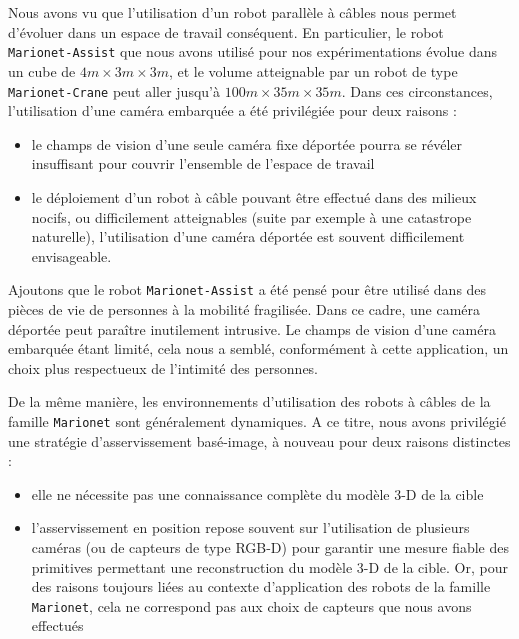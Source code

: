 Nous avons vu que l'utilisation d'un robot parallèle à câbles nous permet 
d'évoluer dans un espace de travail conséquent. En particulier, le robot {\tt 
Marionet-Assist} que nous avons utilisé pour nos expérimentations évolue dans 
un cube de $4m \times 3m \times 3m$, et le volume atteignable par un robot de type 
{\tt Marionet-Crane} peut aller jusqu'à $100m \times 35m \times 35m$. Dans ces 
circonstances, l'utilisation d'une caméra embarquée a été privilégiée pour deux 
raisons :
\begin{itemize}
 \item le champs de vision d'une seule caméra fixe déportée pourra se révéler 
insuffisant pour couvrir l'ensemble de l'espace de travail
 \item le déploiement d'un robot à câble pouvant être effectué dans des milieux 
nocifs, ou difficilement atteignables (suite par exemple à une catastrope 
naturelle), l'utilisation d'une caméra déportée est souvent difficilement 
envisageable.
\end{itemize}

Ajoutons que le robot {\tt Marionet-Assist} a été pensé pour être utilisé dans 
des pièces de vie de personnes à la mobilité fragilisée. Dans ce cadre, une 
caméra déportée peut paraître inutilement intrusive. Le champs de vision d'une 
caméra embarquée étant limité, cela nous a semblé, conformément à cette 
application, un choix plus respectueux de l'intimité des personnes. 

De la même manière, les environnements d'utilisation des robots à câbles de la 
famille {\tt Marionet} sont généralement dynamiques. A ce titre, nous avons 
privilégié une stratégie d'asservissement basé-image, à nouveau pour deux 
raisons distinctes :
\begin{itemize}
\item elle ne nécessite pas une connaissance complète du modèle 3-D de la cible 
\item l'asservissement en position repose souvent sur l'utilisation de 
plusieurs 
caméras (ou de capteurs de type RGB-D) pour garantir une mesure fiable des 
primitives permettant une reconstruction du modèle 3-D de la cible. Or, pour 
des 
raisons toujours liées au contexte d'application des robots de la famille {\tt 
Marionet}, cela ne correspond pas aux choix de capteurs que nous avons effectués
\end{itemize}

